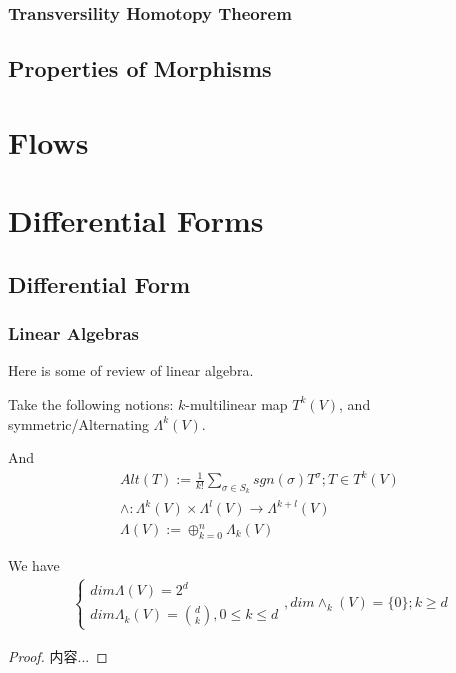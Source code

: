 \documentclass[Total.tex]{subfiles}
\begin{document}
		\subsection{Transversility Homotopy Theorem}
		
		\section{Properties of Morphisms}
	\chapter{Flows}
	\chapter{Differential Forms}
		\section{Differential Form}
			\subsection{Linear Algebras}
			Here is some of review of linear algebra.
			\begin{Def}
				Take the following notions: $k$-multilinear map $T^k(V)$, and symmetric/Alternating $\Lambda^k(V)$.
				
				And
				\begin{gather*}
					Alt(T):=\frac{1}{k!}\sum_{\sigma\in S_k} sgn(\sigma)T^\sigma;T\in T^k(V)\\
					\wedge:\Lambda^k(V)\times \Lambda^l(V)\rightarrow \Lambda^{k+l}(V)\\
					\Lambda(V):=\oplus_{k=0}^n \Lambda_k(V)
				\end{gather*}
			\end{Def}
			\begin{proposition}
				We have
				\begin{gather*}
					\begin{cases}
						dim\Lambda(V)=2^d\\
						dim\Lambda_k(V)=\binom{d}{k},0\leq k\leq d
					\end{cases},dim
					\wedge_k(V)=\{0\};k\geq d
				\end{gather*}
			\end{proposition}
			\begin{proof}
				内容...
			\end{proof}
\end{document}
